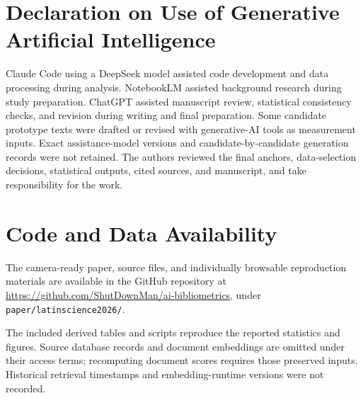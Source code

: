 \documentclass[a4paper,10pt,conference]{IEEEtran}
\begin{document}
\section*{Declaration on Use of Generative Artificial Intelligence}
Claude Code using a DeepSeek model assisted code development and data processing
during analysis. NotebookLM assisted background research during study preparation.
ChatGPT assisted manuscript review, statistical consistency checks, and revision
during writing and final preparation. Some candidate prototype texts were drafted
or revised with generative-AI tools as measurement inputs. Exact assistance-model
versions and candidate-by-candidate generation records were not retained.
The authors reviewed the final anchors, data-selection decisions, statistical
outputs, cited sources, and manuscript, and take responsibility for the work.

\section*{Code and Data Availability}
The camera-ready paper, source files, and individually browsable reproduction
materials are available in the GitHub repository at
\url{https://github.com/ShutDownMan/ai-bibliometrics}, under
\texttt{paper/latinscience2026/}.

The included derived tables and scripts reproduce the reported statistics and
figures. Source database records and document embeddings are omitted under
their access terms; recomputing document scores requires those preserved inputs.
Historical retrieval timestamps and embedding-runtime versions were not recorded.
\end{document}
